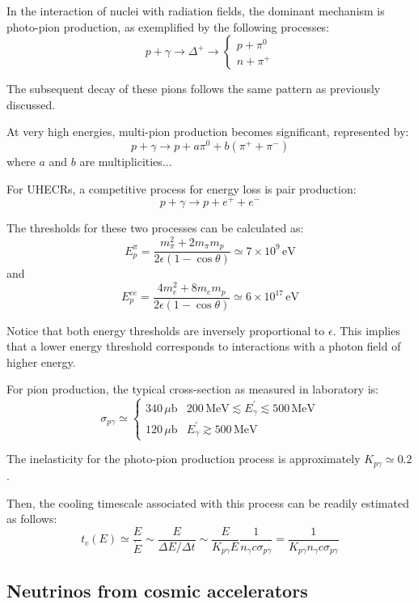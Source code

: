 In the interaction of nuclei with radiation fields, the dominant mechanism is photo-pion production, as exemplified by the following processes:
%
\[
p + \gamma \rightarrow \Delta^+ \rightarrow
\begin{cases} 
p + \pi^0 \\
n + \pi^+
\end{cases}
\]

The subsequent decay of these pions follows the same pattern as previously discussed.

At very high energies, multi-pion production becomes significant, represented by:
%
\[
p + \gamma \rightarrow p + a \pi^0 + b ( \pi^+ + \pi^-)
\]
%
where $a$ and $b$ are multiplicities...

For UHECRs, a competitive process for energy loss is pair production:
%
\[
p + \gamma \rightarrow p + e^+ + e^-
\]

The thresholds for these two processes can be calculated as:
%
\[
E_p^\pi = \frac{m_\pi^2 + 2 m_\pi m_p}{2 \epsilon (1 - \cos \theta)} \simeq 7 \times 10^9 \, \text{eV}
\]
and
\[
E_p^{ee} = \frac{4 m_e^2 + 8 m_e m_p}{2\epsilon (1 - \cos\theta)} \simeq 6 \times 10^{17} \, \text{eV}
\]

Notice that both energy thresholds are inversely proportional to \(\epsilon\). This implies that a lower energy threshold corresponds to interactions with a photon field of higher energy.

For pion production, the typical cross-section as measured in laboratory is:
%
\[
\sigma_{p\gamma} \simeq 
\begin{cases}
340 \, \mu\text{b} & 200 \, \text{MeV} \lesssim E^\prime_\gamma \lesssim 500 \, \text{MeV} \\
120 \, \mu\text{b} & E^\prime_\gamma \gtrsim 500 \, \text{MeV}
\end{cases}
\]

The inelasticity for the photo-pion production process is approximately \(K_{p\gamma} \simeq 0.2\).

Then, the cooling timescale associated with this process can be readily estimated as follows:
\[
t_c(E) \simeq \frac{E}{\dot E} \sim \frac{E}{\Delta E / \Delta t} \sim \frac{E}{K_{p\gamma} E} \frac{1}{n_\gamma c \sigma_{p\gamma}} = \frac{1}{K_{p\gamma} n_\gamma c \sigma_{p\gamma}}
\]

\subsection{Neutrinos from cosmic accelerators}

